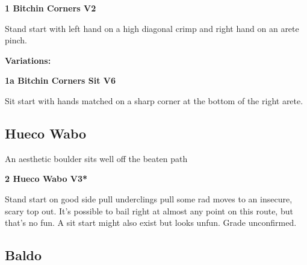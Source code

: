 \begin{multicols}{2}
		
			
			\needspace{1.5cm}
\label{rt:Bitchin Corners}
\colorbox{green!20}{
\parbox{0.95\linewidth}{
\textbf{
1 Bitchin Corners V2  
}}}

			\begin{adjustwidth}{0.5cm}{}			
			Stand start with left hand on a high diagonal crimp and right hand on an arete pinch.
			\end{adjustwidth}
			
				\begin{adjustwidth}{0.5cm}{}				
				\needspace{3cm}
				\textbf{Variations:} \newline
					
					\needspace{1.5cm}
\label{vr:Bitchin Corners Sit}
\colorbox{RoyalBlue!20}{
\parbox{0.95\linewidth}{
\textbf{
1a Bitchin Corners Sit V6  
}}}

					\begin{adjustwidth}{0.5cm}{}			
					Sit start with hands matched on a sharp corner at the bottom of the right arete.
					\end{adjustwidth}
					
					
				\end{adjustwidth}
			
		


		\needspace{1.5cm}
		\subsection*{Hueco Wabo}\label{bf:Hueco Wabo}
		An aesthetic boulder sits well off the beaten path\\
	
		
			
			\needspace{1.5cm}
\label{rt:Hueco Wabo}
\colorbox{green!20}{
\parbox{0.95\linewidth}{
\textbf{
2 Hueco Wabo V3*  
}}}

			\begin{adjustwidth}{0.5cm}{}			
			Stand start on good side pull underclings pull some rad moves to an insecure, scary top out. It's possible to bail right at almost any point on this route, but that's no fun. A sit start might also exist but looks unfun. Grade unconfirmed.
			\end{adjustwidth}
			
			
		


		\needspace{1.5cm}
		\subsection*{Baldo}\label{bf:Baldo}
			

\end{multicols}
